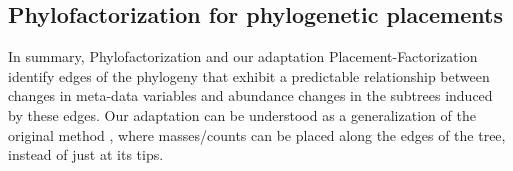 
\subsection{Phylofactorization for phylogenetic placements}
\label{sec:Factorization:sub:Methods:sub:PhylofactorPlacements}

In summary, Phylofactorization and our adaptation Placement-Factorization
identify edges of the phylogeny that exhibit a predictable relationship between changes in meta-data variables and
abundance changes in the subtrees induced by these edges.
Our adaptation can be understood as a generalization of the original method \cite{Washburne2017a,Washburne2019},
where masses/counts can be placed along the edges of the tree, instead of just at its tips.

